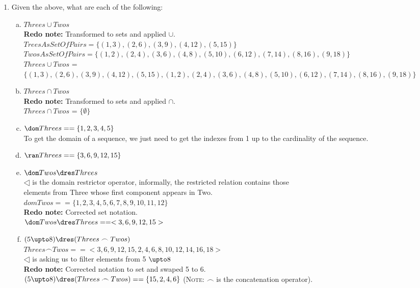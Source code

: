\documentclass{article}
\begin{document}
\begin{enumerate}[\bf I.]
\begin{enumerate}[1.]
\item Given the above, what are each of the following:
\begin{enumerate}[a.]
\item $Threes \cup Twos$ \\
  \textbf{Redo note:} Transformed to sets and applied $\cup$. \\ 
  $TreesAsSetOfPairs = \{(1,3),(2,6),(3,9),(4,12),(5,15) \} $ \\
  $TwosAsSetOfPairs = \{ (1,2),(2,4),(3,6), (4,8), (5,10),(6,12),(7,14), (8,16), (9,18) \}$ \\
  $Threes \cup Twos$ = $\{(1,3),(2,6),(3,9),(4,12),(5,15),(1,2),(2,4),(3,6),(4,8),(5,10),(6,12),(7,14),(8,16),(9,18) \}$ \\
\item $Threes \cap Twos$ \\
  \textbf{Redo note:} Transformed to sets and applied $\cap$. \\
  $Threes \cap Twos$ = $\{\emptyset\}$ \\
\item $\dom Threes == \{1, 2 ,3 ,4 ,5 \}$ \\
  To get the domain of a sequence, we just need to get the indexes from 1 up to the cardinality of the sequence. \\
\item $\ran Threes == \{3 ,6 ,9 ,12 ,15\}$ \\
\item $\dom Twos \dres Threes$ \\
  $\dres$ is the domain restrictor operator, informally, the restricted relation contains those \\
  elements from Three whose first component appears in Two. \\
  $dom Twos == \{1,2,3,4,5,6,7,8,9,10,11,12\}$\\
  \textbf{Redo note:} Corrected set notation. \\
  $\dom Twos \dres Threes ==<3, 6, 9, 12, 15>$\\
\item $(5 \upto 8)\dres (Threes \frown Twos)$\\
  $Threes \frown Twos == <3,6,9,12,15,2,4,6,8,10,12,14,16,18>$ \\
  $\dres$ is asking us to filter elements from 5 $\upto 8$ \\
  \textbf{Redo note:} Corrected notation to set and swaped 5 to 6. \\
  $(5 \upto 8)\dres (Threes \frown Twos) == \{15,2,4,6\}$
(\textsc{Note}: $\frown$ is the concatenation operator).
\end{enumerate}
\end{enumerate}



\end{enumerate}
\end{document}

